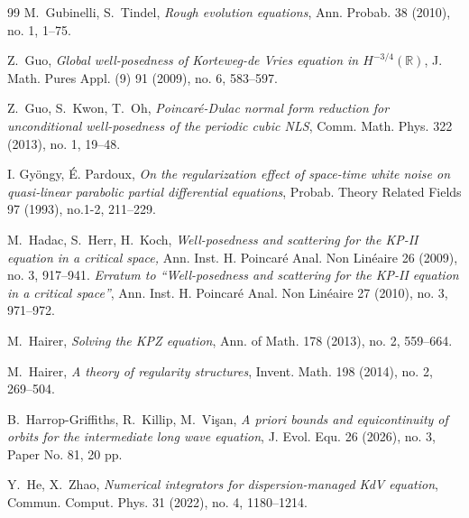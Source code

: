 \documentclass[letterpaper, 11pt,  reqno]{amsart}
\newcommand{\1}{\hspace{0.5mm}\text{I}\hspace{0.5mm}}
\newcommand{\R}{\mathbb{R}}
\numberwithin{equation}{section}
\numberwithin{theorem}{section}
\begin{document}
\begin{thebibliography}{99}
M.~Gubinelli, S.~Tindel,
{\it Rough evolution equations},
Ann. Probab. 38 (2010), no. 1, 1--75.



Z.~Guo,
{\it  Global well-posedness of Korteweg-de Vries equation in $H^{-3/4}(\R)$}, 
J. Math. Pures Appl. (9) 91 (2009), no. 6, 583--597.


Z.~Guo, S.~Kwon, T.~Oh, 
{\it Poincar\'e-Dulac normal form reduction for unconditional well-posedness of
the periodic cubic NLS}, Comm. Math. Phys. 322 (2013), no. 1, 19--48.



I. Gy{\"o}ngy, 
{\'E}. Pardoux, 
{\it On the regularization effect of space-time white noise on quasi-linear parabolic partial differential equations}, 
Probab. Theory Related Fields 97 (1993), no.1-2, 211--229.



M.~Hadac, S.~Herr, H.~Koch,
{\it Well-posedness and scattering for the KP-II equation in a critical space,}
 Ann. Inst. H. Poincar\'e Anal. Non Lin\'eaire  26 (2009), no. 3, 917--941.
{\it  Erratum to ``Well-posedness and scattering for the KP-II equation in a critical space''},
Ann. Inst. H. Poincar\'e Anal. Non Lin\'eaire 27 (2010), no. 3, 971--972.


%
%


M.~Hairer,
{\it Solving the KPZ equation},
Ann. of Math.  178 (2013), no. 2, 559--664.



M.~Hairer,
{\it A theory of regularity structures},
Invent. Math. 198 (2014), no. 2, 269--504.

%
%
%


B.~Harrop-Griffiths, R.~Killip, M.~Vi\c{s}an,
\textit{A priori bounds and equicontinuity of orbits for the intermediate long wave equation}, 
 J. Evol. Equ. 26 (2026), no. 3, Paper No. 81, 20 pp.



Y.~He, X.~Zhao,
{\it Numerical integrators for dispersion-managed KdV equation}, 
Commun. Comput. Phys. 31 (2022), no. 4, 1180--1214. 



\end{thebibliography}
\end{document}
